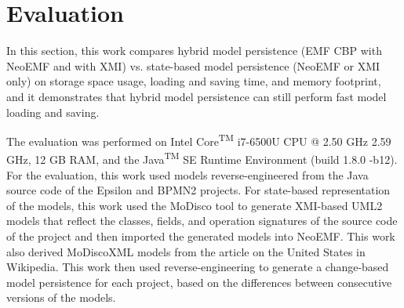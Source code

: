 \section{Evaluation}
\label{sec:evaluation_5}
In this section, this work compares hybrid model persistence (EMF CBP with NeoEMF and with XMI) vs. state-based model persistence (NeoEMF or XMI only) on storage space usage, loading and saving time, and memory footprint, and it demonstrates that hybrid model persistence can still perform fast model loading and saving.

The evaluation was performed on Intel\textsuperscript{\textregistered} Core\textsuperscript{TM} i7-6500U CPU @ 2.50 GHz 2.59 GHz, 12 GB RAM, and the Java\textsuperscript{TM} SE Runtime Environment (build 1.8.0 -b12). For the evaluation, this work used models reverse-engineered from the Java source code of the Epsilon \cite{eclipse2017epsilon,eclipse2018epsilongit} and BPMN2 \cite{eclipse2017bpmn2} projects. For state-based representation of the models, this work used the MoDisco tool \cite{DBLP:journals/infsof/BruneliereCDM14} to generate XMI-based UML2 \cite{eclipse2017uml2} models that reflect the classes, fields, and operation signatures of the source code of the project and then imported the generated models into NeoEMF. This work also derived MoDiscoXML models \cite{eclipse2018modiscoxml} from the article on the United States in Wikipedia\cite{wikipedia2018us}. This work then used reverse-engineering to generate a change-based model persistence for each project, based on the differences between consecutive versions of the models.

